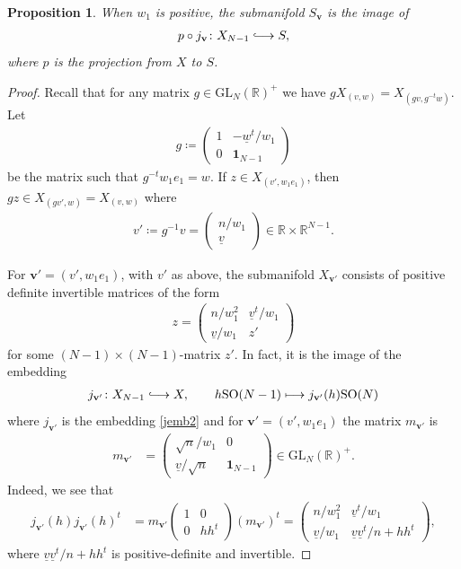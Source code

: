 \documentclass[a4paper,11pt]{amsart} %
\newcommand{\8}{\infty}
\newcommand{\id}{\mathbf{1}}
\newcommand{\wud}{\underline{w}}
\newcommand{\vud}{\underline{v}}
\newcommand{\vbf}{\mathbf{v}}
\newcommand{\SO}{\mathrm{SO}}
\newcommand{\GL}{\mathrm{GL}}
\newcommand{\R}{\mathbb{R}}
\newcommand{\hooklongrightarrow}{\lhook\joinrel\longrightarrow}
\theoremstyle{mytheoremstyle}
\newtheorem{prop}[thm]{Proposition}
\theoremstyle{remark}
\numberwithin{equation}{section}
\begin{document}
\begin{prop} When $w_1$ is positive, the submanifold $S_\vbf$ is the image of \begin{align}
    p \circ j_\vbf \colon X_{N-1} \hooklongrightarrow S, 
\end{align}
where $p$ is the projection from $X$ to $S$.
\end{prop}
\begin{proof} Recall that for any matrix $g \in \GL_N(\R)^+$ we have $gX_{(v,w)}=X_{(gv,g^{-t}w)}$. Let
\begin{align}
    g \coloneqq  \begin{pmatrix}
    1 & -\wud^t/w_1 \\
     0 & \id_{N-1}
    \end{pmatrix}
\end{align}
be the matrix such that $g^{-t}w_1e_1=w$. If $z \in X_{(v',w_1e_1)}$, then $gz \in X_{(gv',w)}=X_{(v,w)}$ where 
\begin{align}
v' \coloneqq g^{-1}v= \begin{pmatrix} n/w_1\\ \vud\end{pmatrix} \in \R \times \R^{N-1}.
\end{align}

For $\vbf'=(v',w_1e_1)$, with $v'$ as above, the submanifold $X_{\vbf'}$ consists of positive definite invertible matrices of the form
\begin{align}
    z= \begin{pmatrix}
        n/w_1^2 & \vud^t/w_1 \\
        \vud/w_1 & z'
    \end{pmatrix}
\end{align}
for some $(N-1) \times (N-1)$-matrix $z'$. In fact, it is the image of the embedding
\begin{align}
    j_{\vbf'} \colon X_{N-1} \hooklongrightarrow X, \qquad h\SO(N-1) \longmapsto j_{\vbf'}(h)\SO(N)
\end{align}
where $j_{\vbf'}$ is the embedding \eqref{jemb2} and for $\vbf'=(v',w_1e_1)$ the matrix $m_{\vbf'}$ is
\begin{align}
    m_{\vbf'} & = \begin{pmatrix}
        \sqrt{n}/w_1 & 0 \\
        \vud/\sqrt{n} & \id_{N-1}
    \end{pmatrix} \in \GL_N(\R)^+.
\end{align}
Indeed, we see that
\begin{align}
 j_{\vbf'}(h)j_{\vbf'}(h)^t & =   m_{\vbf'} \begin{pmatrix}
     1 & 0 \\ 0 & hh^t
 \end{pmatrix} (m_{\vbf'})^t = \begin{pmatrix}
     n/w_1^2 & \vud^t/w_1 \\ \vud/w_1 & \vud \vud^t/n+hh^t
 \end{pmatrix},
\end{align}
where $ \vud \vud^t/n+hh^t$ is positive-definite and invertible.


\end{proof}
\end{document}
